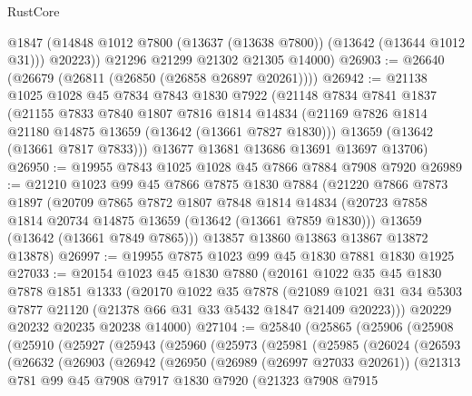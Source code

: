\begin{lexlean}{RustCore}
\begin{coremodule}
          @1847
          (@14848 @1012 @7800 (@13637 (@13638 @7800)) (@13642 (@13644 @1012 @31)))
          @20223))
      @21296
      @21299
      @21302
      @21305
      @14000)
@26903 := @26640 (@26679 (@26811 (@26850 (@26858 @26897 @20261))))
@26942 := @21138
    @1025
    @1028
    @45
    @7834
    @7843
    @1830
    @7922
    (@21148
      @7834
      @7841
      @1837
      (@21155
        @7833
        @7840
        @1807
        @7816
        @1814
        @14834
        (@21169 @7826 @1814 @21180 @14875 @13659 (@13642 (@13661 @7827 @1830)))
        @13659
        (@13642 (@13661 @7817 @7833)))
      @13677
      @13681
      @13686
      @13691
      @13697
      @13706)
@26950 := @19955 @7843 @1025 @1028 @45 @7866 @7884 @7908 @7920
@26989 := @21210
    @1023
    @99
    @45
    @7866
    @7875
    @1830
    @7884
    (@21220
      @7866
      @7873
      @1897
      (@20709
        @7865
        @7872
        @1807
        @7848
        @1814
        @14834
        (@20723 @7858 @1814 @20734 @14875 @13659 (@13642 (@13661 @7859 @1830)))
        @13659
        (@13642 (@13661 @7849 @7865)))
      @13857
      @13860
      @13863
      @13867
      @13872
      @13878)
@26997 := @19955 @7875 @1023 @99 @45 @1830 @7881 @1830 @1925
@27033 := @20154
    @1023
    @45
    @1830
    @7880
    (@20161
      @1022
      @35
      @45
      @1830
      @7878
      @1851
      @1333
      (@20170
        @1022
        @35
        @7878
        (@21089 @1021 @31 @34 @5303 @7877 @21120 (@21378 @66 @31 @33 @5432 @1847 @21409 @20223)))
      @20229
      @20232
      @20235
      @20238
      @14000)
@27104 := @25840
    (@25865
      (@25906
        (@25908
          (@25910
            (@25927
              (@25943
                (@25960
                  (@25973
                    (@25981
                      (@25985
                        (@26024
                          (@26593
                            (@26632
                              (@26903
                                (@26942
                                  (@26950
                                    (@26989 (@26997 @27033 @20261))
                                    (@21313
                                      @781
                                      @99
                                      @45
                                      @7908
                                      @7917
                                      @1830
                                      @7920
                                      (@21323
                                        @7908
                                        @7915

\end{coremodule}
\end{lexlean}
